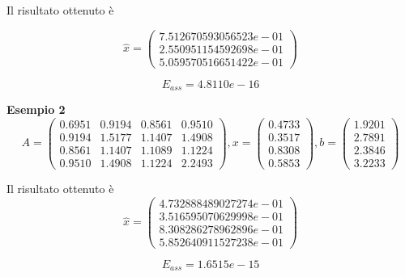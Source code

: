 Il risultato ottenuto è

\[
\hat{x} = \begin{pmatrix}
7.512670593056523e-01\\
2.550951154592698e-01\\
5.059570516651422e-01
\end{pmatrix}
\]

\[
E_{ass} = 4.8110e-16
\]

\textbf{Esempio 2}
\[
A = \begin{pmatrix}
0.6951 & 0.9194 & 0.8561 & 0.9510\\
0.9194 & 1.5177 & 1.1407 & 1.4908\\
0.8561 & 1.1407 & 1.1089 & 1.1224\\
0.9510 & 1.4908 & 1.1224 & 2.2493
\end{pmatrix}, x = \begin{pmatrix}
0.4733\\
0.3517\\
0.8308\\
0.5853
\end{pmatrix}, b = \begin{pmatrix}
1.9201\\
2.7891\\
2.3846\\
3.2233
\end{pmatrix}
\]

Il risultato ottenuto è
\[
\hat{x} = \begin{pmatrix}
4.732888489027274e-01\\
3.516595070629998e-01\\
8.308286278962896e-01\\
5.852640911527238e-01

\end{pmatrix}
\]

\[
E_{ass} = 1.6515e-15
\]
